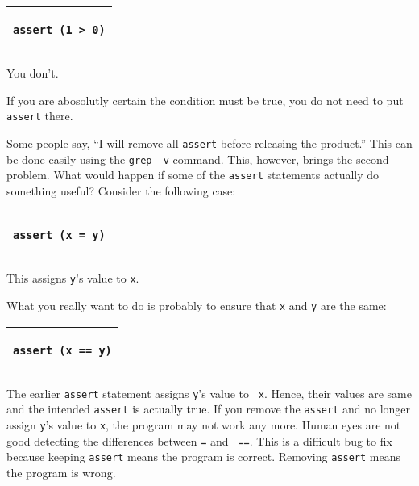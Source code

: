 \vspace{0.2in}

\noindent
\begin{tabular}{|p{5in}|}\hline
\begin{verbatim}
assert (1 > 0)
\end{verbatim}
\\ \hline
\end{tabular}
\vspace{0.2in}

You don't.

If you are abosolutly certain the condition must be true, you do not
need to put {\tt assert} there.

Some people say, ``I will remove all {\tt assert} before releasing the
product.''  This can be done easily using the {\tt grep -v} command.
This, however, brings the second problem.  What would happen if
some of the {\tt assert} statements actually do something useful?
Consider the following case:



\vspace{0.2in}

\noindent
\begin{tabular}{|p{5in}|}\hline
\begin{verbatim}
assert (x = y)
\end{verbatim}
\\ \hline
\end{tabular}
\vspace{0.2in}

This assigns {\tt y}'s value to {\tt x}.

What you really want to do is probably to ensure that  {\tt x} and {\tt y}
are the same:

\vspace{0.2in}

\noindent
\begin{tabular}{|p{5in}|}\hline
\begin{verbatim}
assert (x == y)
\end{verbatim}
\\ \hline
\end{tabular}
\vspace{0.2in}

The earlier {\tt assert} statement assigns {\tt y}'s value to {\tt
  x}. Hence, their values are same and the intended {\tt assert} is
actually true.  If you remove the {\tt assert} and no longer assign
{\tt y}'s value to {\tt x}, the program may not work any more. Human
eyes are not good detecting the differences between {\tt =} and {\tt
  ==}. This is a difficult bug to fix because keeping {\tt assert}
means the program is correct. Removing {\tt assert} means the program
is wrong.


